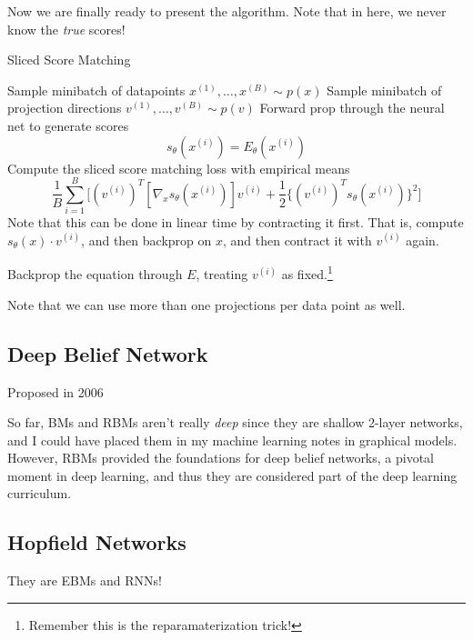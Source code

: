\documentclass{article}
\begin{document}
    \begin{algo}
      Now we are finally ready to present the algorithm. Note that in here, we never know the \textit{true} scores! 
      \begin{algorithm}[H]
      \caption{Sliced Score Matching}
      \label{alg:sliced_score_matching}
      \begin{algorithmic}[1]  

          \State Sample minibatch of datapoints $x^{(1)}, \ldots, x^{(B)} \sim p(x)$ 
          \State Sample minibatch of projection directions $v^{(1)}, \ldots, v^{(B)} \sim p(v)$ 
          \State Forward prop through the neural net to generate scores 
          \begin{equation}
            s_\theta (x^{(i)}) = E_\theta(x^{(i)})
          \end{equation}
          \State Compute the sliced score matching loss with empirical means 
          \begin{equation}
            \frac{1}{B} \sum_{i=1}^B \Big[ (v^{(i)})^T [\nabla_x s_\theta (x^{(i)})] v^{(i)} + \frac{1}{2} \big\{ (v^{(i)})^T s_\theta(x^{(i)}) \big\}^2 \Big]
          \end{equation} 
          Note that this can be done in linear time by contracting it first. That is, compute $s_\theta (x) \cdot v^{(i)}$, and then backprop on $x$, and then contract it with $v^{(i)}$ again. 

          \State Backprop the equation through $E$, treating $v^{(i)}$ as fixed.\footnote{Remember this is the reparamaterization trick!}
        \EndWhile
      \end{algorithmic}
      \end{algorithm}
      Note that we can use more than one projections per data point as well. 
    \end{algo}

\subsection{Deep Belief Network} 

  Proposed in 2006

  So far, BMs and RBMs aren't really \textit{deep} since they are shallow 2-layer networks, and I could have placed them in my machine learning notes in graphical models. However, RBMs provided the foundations for deep belief networks, a pivotal moment in deep learning, and thus they are considered part of the deep learning curriculum. 

\subsection{Hopfield Networks}

  They are EBMs and RNNs!




\end{document}
